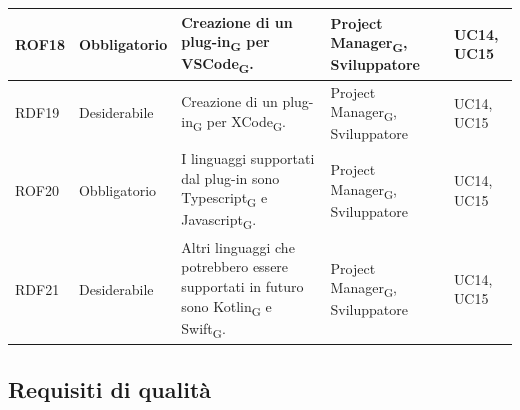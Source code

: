 \documentclass{article}
\begin{document}
\begin{center}
\begin{tabular}{|p{2cm}|p{3cm}|p{6cm}|p{3cm}|p{2cm}|}
\hline
\rowcolor{LightBlue}
ROF18&Obbligatorio & Creazione di un plug-in\textsubscript{G} per VSCode\textsubscript{G}.& Project Manager\textsubscript{G}, Sviluppatore& UC14, UC15\\
\hline
\rowcolor{LighterBlue}
RDF19&Desiderabile & Creazione di un plug-in\textsubscript{G} per XCode\textsubscript{G}.& Project Manager\textsubscript{G}, Sviluppatore& UC14, UC15\\
\hline
\rowcolor{LightBlue}
ROF20&Obbligatorio & I linguaggi supportati dal plug-in sono Typescript\textsubscript{G} e Javascript\textsubscript{G}. & Project Manager\textsubscript{G}, Sviluppatore &UC14, UC15\\
\hline
\rowcolor{LighterBlue}
RDF21&Desiderabile & Altri linguaggi che potrebbero essere supportati in futuro sono Kotlin\textsubscript{G} e Swift\textsubscript{G}.& Project Manager\textsubscript{G}, Sviluppatore &UC14, UC15\\
\hline

\end{tabular}
\label{tab:reqfunz}
\end{center}

\subsection{Requisiti di qualità}
\end{document}
